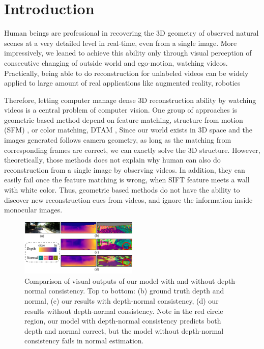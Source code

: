 \section{Introduction}
\label{sec:intro}
Human beings are professional in recovering the 3D geometry of observed natural scenes at a very detailed level in real-time, even from a single image. 
More impressively, we leaned to achieve this ability only through visual perception of consecutive changing of outside world and ego-motion, \ie watching videos. 
Practically, being able to do reconstruction for unlabeled videos can be widely applied to large amount of real applications like augmented reality, robotics \etc

Therefore, letting computer manage dense 3D reconstruction ability by watching videos is a central problem of computer vision. 
One group of approaches is geometric based method depend on feature matching, \eg structure from motion (SFM) \cite{wu2011visualsfm} \etc, or color matching, \eg DTAM \cite{NewcombeLD11}, \etc  Since our world exists in 3D space and the images generated follows camera geometry, as long as the matching from corresponding frames are correct, we can exactly solve the 3D structure. 
However, theoretically, those methods does not explain why human can also do reconstruction from a single image by observing videos. In addition, they can easily fail once the feature matching is wrong, \eg when SIFT \cite{lowe2004distinctive}  feature meets a wall with white color. 
Thus, geometric based methods do not have the ability to discover new reconstruction cues from videos, and ignore the information inside monocular images.

\begin{figure}
\centering
\includegraphics[width=0.5\textwidth]{figures/visual_comparison.pdf}
\caption{Comparison of visual outputs of our model with and without depth-normal consistency. Top to bottom: (b) ground truth depth and normal, (c) our results with depth-normal consistency, (d) our results without depth-normal consistency. Note in the red circle region, our model with depth-normal consistency predicts both depth and normal correct, but the model without depth-normal consistency fails in normal estimation.}
\label{fig:visual_comparison}
\end{figure}


